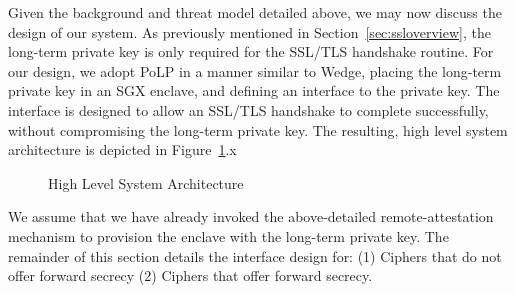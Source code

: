 \documentclass[../../main.tex]{subfiles}
\begin{document}
Given the background and threat model detailed above, we may now
discuss the design of our system. As previously mentioned in
Section~\ref{sec:ssloverview}, the long-term private key is only
required for the SSL/TLS handshake routine. For our design, we adopt
PoLP in a manner similar to Wedge, placing the long-term private key
in an SGX enclave, and defining an interface to the private key. The
interface is designed to allow an SSL/TLS handshake to complete
successfully, without compromising the long-term private key. The
resulting, high level system architecture is depicted in
Figure~\ref{fig:sysarch}.x

\begin{figure}[H]
  \centering
  \caption{High Level System Architecture}
  \label{fig:sysarch}
\end{figure}

We assume that we have already invoked the above-detailed
remote-attestation mechanism to provision the enclave with the
long-term private key. The remainder of this section details the
interface design for: (1) Ciphers that do not offer forward secrecy
(2) Ciphers that offer forward secrecy.


\end{document}
